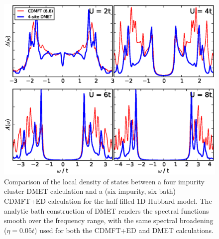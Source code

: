 \documentclass[aps,twocolumn,nobibnotes]{revtex4}
\begin{document}
\begin{figure}
\begin{center}
    \vspace{-2mm}
\includegraphics[scale=0.425]{1D_Hub_Spectra.eps}
\end{center}
    \vspace{-5mm}
\caption{Comparison of the local density of states between a four impurity cluster DMET calculation and a
(six impurity, six bath) CDMFT+ED calculation for the half-filled 1D Hubbard model. The analytic bath construction
of DMET renders the spectral functions smooth over the frequency range, with the same spectral broadening ($\eta=0.05t$) used for
both the CDMFT+ED and DMET calculations.}
\label{1D_DOS}
\end{figure}
\end{document}
